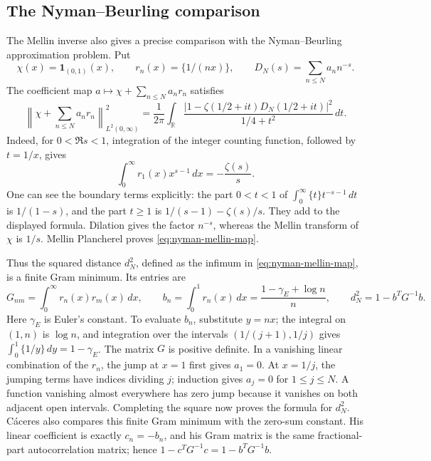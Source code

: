 \subsection{The Nyman--Beurling comparison}
\label{subsec:mobius-nyman}

The Mellin inverse also gives a precise comparison with the
Nyman--Beurling approximation problem. Put
\[
 \chi(x)=\mathbf1_{(0,1)}(x),\qquad
 r_n(x)=\{1/(nx)\},\qquad
 D_N(s)=\sum_{n\le N}a_n n^{-s}.
\]
The coefficient map \(a\mapsto\chi+\sum_{n\le N}a_n r_n\)
satisfies
\begin{equation}\label{eq:nyman-mellin-map}
 \left\|\chi+\sum_{n\le N}a_n r_n\right\|_{L^2(0,\infty)}^2
 =\frac1{2\pi}\int_{\mathbb R}
  \frac{|1-\zeta(1/2+it)D_N(1/2+it)|^2}{1/4+t^2}\,dt.
\end{equation}
Indeed, for \(0<\Re s<1\), integration of the integer counting
function, followed by \(t=1/x\), gives
\[
 \int_0^\infty r_1(x)x^{s-1}\,dx=-\frac{\zeta(s)}s.
\]
One can see the boundary terms explicitly: the part \(0<t<1\)
of \(\int_0^\infty\{t\}t^{-s-1}\,dt\) is \(1/(1-s)\),
and the part \(t\ge1\) is \(1/(s-1)-\zeta(s)/s\).
They add to the displayed formula. Dilation gives the factor
\(n^{-s}\), whereas the Mellin transform of \(\chi\) is
\(1/s\). Mellin Plancherel proves \eqref{eq:nyman-mellin-map}.

Thus the squared distance \(d_N^2\), defined as the infimum in
\eqref{eq:nyman-mellin-map}, is a finite Gram minimum. Its entries
are
\[
 G_{nm}=\int_0^\infty r_n(x)r_m(x)\,dx,\qquad
 b_n=\int_0^1r_n(x)\,dx
       =\frac{1-\gamma_{\!E}+\log n}{n},
 \qquad d_N^2=1-b^TG^{-1}b.
\]
Here \(\gamma_{\!E}\) is Euler's constant. To evaluate \(b_n\),
substitute \(y=nx\); the integral on \((1,n)\) is \(\log n\),
and integration over the intervals
\((1/(j+1),1/j)\) gives
\(\int_0^1\{1/y\}\,dy=1-\gamma_{\!E}\).
The matrix \(G\) is positive definite. In a vanishing linear
combination of the \(r_n\), the jump at \(x=1\) first gives
\(a_1=0\). At \(x=1/j\), the jumping terms have indices
dividing \(j\); induction gives \(a_j=0\) for \(1\le j\le N\).
A function vanishing almost everywhere has zero jump because it
vanishes on both adjacent open intervals. Completing the square
now proves the formula for \(d_N^2\).
C\'aceres \cite[Sections~14, 16--17, pp.~50--52]{caceres-margin-v2}
also compares this finite Gram minimum with the zero-sum constant.
His linear coefficient is exactly \(c_n=-b_n\), and his Gram
matrix is the same fractional-part autocorrelation matrix; hence
\(1-c^TG^{-1}c=1-b^TG^{-1}b\).


